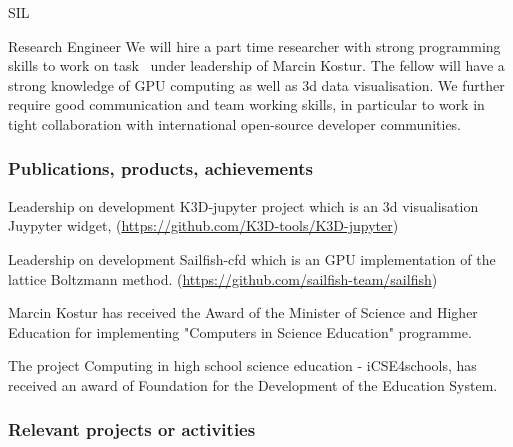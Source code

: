 \begin{sitedescription}{SIL}
\begin{participant}[type=R,PM=16,salary=2500]{Research Engineer}
    We will hire a part time researcher with strong programming skills to work on task~ under leadership of Marcin Kostur. 
The fellow will have a strong knowledge of GPU computing as well as 3d data visualisation. 
We further require good communication and team working skills, in particular to work in tight collaboration with international open-source developer communities.
\end{participant}

\subsubsection*{Publications, products, achievements}

\begin{compactenum}
\item Leadership on development K3D-jupyter project which is an 3d visualisation Juypyter widget, (\url{https://github.com/K3D-tools/K3D-jupyter})
\item Leadership on development Sailfish-cfd which is an GPU implementation of the lattice Boltzmann method. (\url{https://github.com/sailfish-team/sailfish})\cite{januszewski2014sailfish}
\item Marcin Kostur has received the Award of the Minister of Science and Higher Education for implementing "Computers in Science Education" programme.
\item The project  Computing in high school science education - iCSE4schools, has received an award of Foundation for the Development of the Education System.


\end{compactenum}

\subsubsection*{Relevant projects or activities}


\end{sitedescription}
